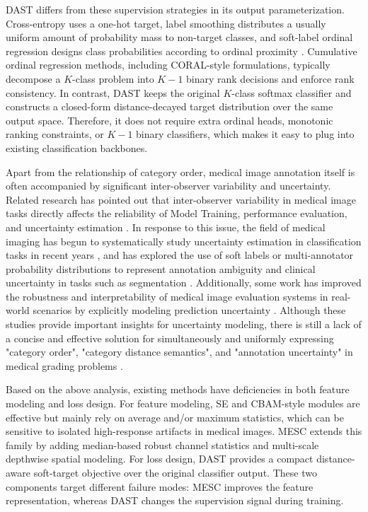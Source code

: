 \documentclass[runningheads]{llncs}
\begin{document}
DAST differs from these supervision strategies in its output parameterization. Cross-entropy uses a one-hot target, label smoothing distributes a usually uniform amount of probability mass to non-target classes, and soft-label ordinal regression designs class probabilities according to ordinal proximity \cite{9}. Cumulative ordinal regression methods, including CORAL-style formulations, typically decompose a \(K\)-class problem into \(K-1\) binary rank decisions and enforce rank consistency. In contrast, DAST keeps the original \(K\)-class softmax classifier and constructs a closed-form distance-decayed target distribution over the same output space. Therefore, it does not require extra ordinal heads, monotonic ranking constraints, or \(K-1\) binary classifiers, which makes it easy to plug into existing classification backbones.

Apart from the relationship of category order, medical image annotation itself is often accompanied by significant inter-observer variability and uncertainty. Related research has pointed out that inter-observer variability in medical image tasks directly affects the reliability of Model Training, performance evaluation, and uncertainty estimation \cite{24}. In response to this issue, the field of medical imaging has begun to systematically study uncertainty estimation in classification tasks in recent years \cite{23}, and has explored the use of soft labels or multi-annotator probability distributions to represent annotation ambiguity and clinical uncertainty in tasks such as segmentation \cite{25,26}. Additionally, some work has improved the robustness and interpretability of medical image evaluation systems in real-world scenarios by explicitly modeling prediction uncertainty \cite{27}. Although these studies provide important insights for uncertainty modeling, there is still a lack of a concise and effective solution for simultaneously and uniformly expressing "category order", "category distance semantics", and "annotation uncertainty" in medical grading problems \cite{9,10,23,25,26,27}.

Based on the above analysis, existing methods have deficiencies in both feature modeling and loss design. For feature modeling, SE and CBAM-style modules are effective but mainly rely on average and/or maximum statistics, which can be sensitive to isolated high-response artifacts in medical images. MESC extends this family by adding median-based robust channel statistics and multi-scale depthwise spatial modeling. For loss design, DAST provides a compact distance-aware soft-target objective over the original classifier output. These two components target different failure modes: MESC improves the feature representation, whereas DAST changes the supervision signal during training.
\end{document}
